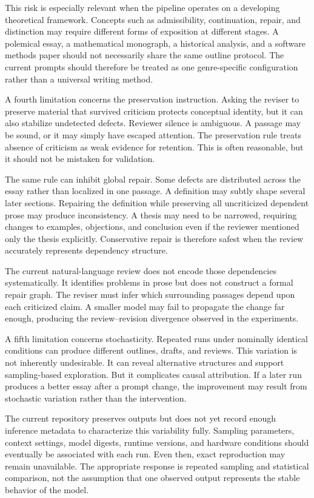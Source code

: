 \documentclass[11pt]{article}
\begin{document}
This risk is especially relevant when the pipeline operates on a developing theoretical framework. Concepts such as admissibility, continuation, repair, and distinction may require different forms of exposition at different stages. A polemical essay, a mathematical monograph, a historical analysis, and a software methods paper should not necessarily share the same outline protocol. The current prompts should therefore be treated as one genre-specific configuration rather than a universal writing method.

A fourth limitation concerns the preservation instruction. Asking the reviser to preserve material that survived criticism protects conceptual identity, but it can also stabilize undetected defects. Reviewer silence is ambiguous. A passage may be sound, or it may simply have escaped attention. The preservation rule treats absence of criticism as weak evidence for retention. This is often reasonable, but it should not be mistaken for validation.

The same rule can inhibit global repair. Some defects are distributed across the essay rather than localized in one passage. A definition may subtly shape several later sections. Repairing the definition while preserving all uncriticized dependent prose may produce inconsistency. A thesis may need to be narrowed, requiring changes to examples, objections, and conclusion even if the reviewer mentioned only the thesis explicitly. Conservative repair is therefore safest when the review accurately represents dependency structure.

The current natural-language review does not encode those dependencies systematically. It identifies problems in prose but does not construct a formal repair graph. The reviser must infer which surrounding passages depend upon each criticized claim. A smaller model may fail to propagate the change far enough, producing the review--revision divergence observed in the experiments.

A fifth limitation concerns stochasticity. Repeated runs under nominally identical conditions can produce different outlines, drafts, and reviews. This variation is not inherently undesirable. It can reveal alternative structures and support sampling-based exploration. But it complicates causal attribution. If a later run produces a better essay after a prompt change, the improvement may result from stochastic variation rather than the intervention.

The current repository preserves outputs but does not yet record enough inference metadata to characterize this variability fully. Sampling parameters, context settings, model digests, runtime versions, and hardware conditions should eventually be associated with each run. Even then, exact reproduction may remain unavailable. The appropriate response is repeated sampling and statistical comparison, not the assumption that one observed output represents the stable behavior of the model.
\end{document}
